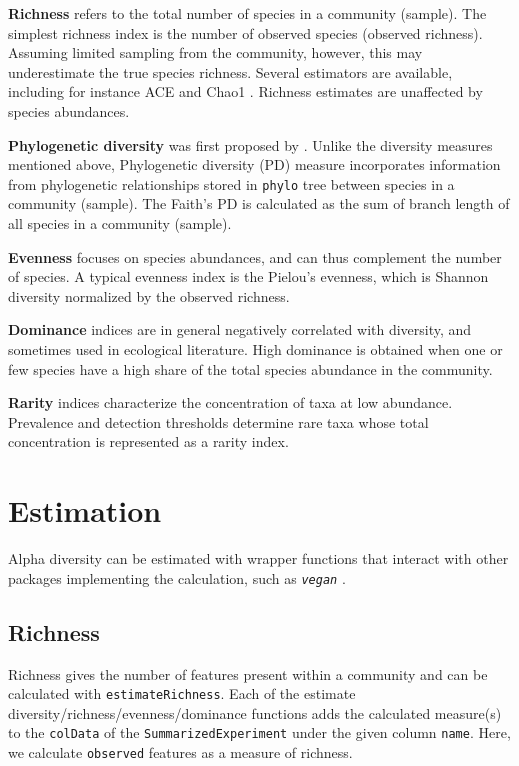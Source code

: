 \documentclass[
]{book}
\begin{document}
\textbf{Richness} refers to the total number of species in a community
(sample). The simplest richness index is the number of observed
species (observed richness). Assuming limited sampling from the
community, however, this may underestimate the true species
richness. Several estimators are available, including for instance ACE
\citep{Chao1992} and Chao1 \citep{Chao1984}. Richness estimates are unaffected
by species abundances.

\textbf{Phylogenetic diversity} was first proposed by \citep{Faith1992}. Unlike the
diversity measures mentioned above, Phylogenetic diversity (PD)
measure incorporates information from phylogenetic relationships
stored in \texttt{phylo} tree between species in a community (sample). The
Faith's PD is calculated as the sum of branch length of all species in
a community (sample).

\textbf{Evenness} focuses on species abundances, and can thus complement
the number of species. A typical evenness index is the Pielou's
evenness, which is Shannon diversity normalized by the observed
richness.

\textbf{Dominance} indices are in general negatively correlated with
diversity, and sometimes used in ecological literature. High
dominance is obtained when one or few species have a high share of
the total species abundance in the community.

\textbf{Rarity} indices characterize the concentration of taxa at low abundance.
Prevalence and detection thresholds determine rare taxa whose total concentration
is represented as a rarity index.

\hypertarget{estimation}{%
\section{Estimation}\label{estimation}}

Alpha diversity can be estimated with wrapper functions that interact
with other packages implementing the calculation, such as \emph{\texttt{vegan}}
\citep{R_vegan}.

\hypertarget{richness}{%
\subsection{Richness}\label{richness}}

Richness gives the number of features present within a community and can be calculated with \texttt{estimateRichness}. Each of the estimate diversity/richness/evenness/dominance functions adds the calculated measure(s) to the \texttt{colData} of the \texttt{SummarizedExperiment} under the given column \texttt{name}. Here, we calculate \texttt{observed} features as a measure of richness.
\end{document}

